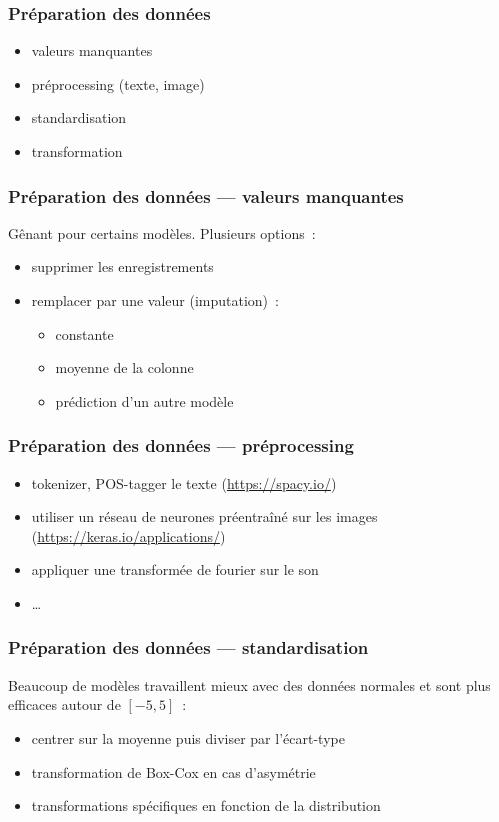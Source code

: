 \documentclass{formation}
\begin{document}
\begin{frame}
  \frametitle{Préparation des données}

  \begin{itemize}
  \item valeurs manquantes
  \item préprocessing (texte, image)
  \item standardisation
  \item transformation
  \end{itemize}
\end{frame}

\begin{frame}
  \frametitle{Préparation des données — valeurs manquantes}

  Gênant pour certains modèles. Plusieurs options :

  \begin{itemize}[<+->]
  \item supprimer les enregistrements
  \item remplacer par une valeur (imputation) :
    \begin{itemize}[<+->]
    \item constante
    \item moyenne de la colonne
    \item prédiction d'un autre modèle
    \end{itemize}
  \end{itemize}
\end{frame}

\begin{frame}
  \frametitle{Préparation des données — préprocessing}

  \begin{itemize}
  \item tokenizer, POS-tagger le texte (\url{https://spacy.io/})
  \item utiliser un réseau de neurones préentraîné sur les images
    (\url{https://keras.io/applications/})
  \item appliquer une transformée de fourier sur le son
  \item …
  \end{itemize}
\end{frame}

\begin{frame}
  \frametitle{Préparation des données — standardisation}

  Beaucoup de modèles travaillent mieux avec des données normales et
  sont plus efficaces autour de $[-5, 5]$ :

  \begin{itemize}
  \item centrer sur la moyenne puis diviser par l'écart-type
  \item transformation de Box-Cox en cas d'asymétrie
  \item transformations spécifiques en fonction de la distribution
  \end{itemize}
\end{frame}
\end{document}
